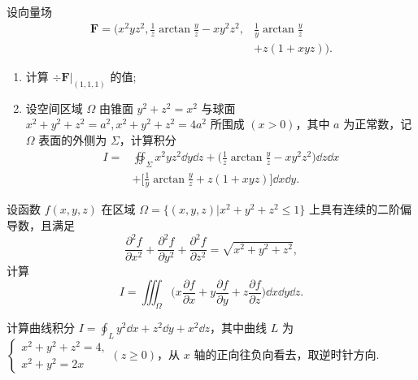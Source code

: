 	\begin{ti}
		设向量场
		\begin{align*}
			\bm F = \Biggl( x^{2} y z^{2}, \frac{1}{z} \arctan \frac{y}{z} - x y^{2} z^{2}, &\frac{1}{y} \arctan \frac{y}{z}\\
			&+ z(1 + xyz) \Biggr).
		\end{align*}
		\begin{enumerate}
			\item 计算 $\div \bm F |_{(1,1,1)}$ 的值;
			\item 设空间区域 $\varOmega$ 由锥面 $y^{2} + z^{2} = x^{2}$ 与球面 $x^{2} + y^{2} + z^{2} = a^{2}, x^{2} + y^{2} + z^{2} = 4 a^{2}$ 所围成 $(x > 0)$，其中 $a$ 为正常数，记 $\varOmega$ 表面的外侧为 $\varSigma$，计算积分
			\begin{align*}
				I =& \oiint_{\varSigma} x^{2} y z^{2} \dd{y} \dd{z} + \Biggl( \frac{1}{z} \arctan \frac{y}{z} - x y^{2} z^{2} \Biggr) \dd{z} \dd{x}\\
				&+ \Biggl[ \frac{1}{y} \arctan \frac{y}{z} + z(1 + xyz) \Biggr] \dd{x} \dd{y}.
			\end{align*}
		\end{enumerate}
	\end{ti}

	\begin{ti}
		设函数 $f(x,y,z)$ 在区域 $\varOmega = \bigl\{ (x,y,z) \bigl| x^{2} + y^{2} + z^{2} \leq 1 \bigr\}$ 上具有连续的二阶偏导数，且满足
		\[
			\frac{\partial^{2}f}{\partial x^{2}} + \frac{\partial^{2}f}{\partial y^{2}} + \frac{\partial^{2}f}{\partial z^{2}} = \sqrt{x^{2} + y^{2} + z^{2}},
		\]
		计算
		\[
			I = \iiint_{\varOmega} \Biggl( x \frac{\partial f}{\partial x} + y \frac{\partial f}{\partial y} + z \frac{\partial f}{\partial z} \Biggr) \dd{x} \dd{y} \dd{z}.
		\]
	\end{ti}

	\begin{ti}
		计算曲线积分 $I = \oint_{L} y^{2} \dd{x} + z^{2} \dd{y} + x^{2} \dd{z}$，其中曲线 $L$ 为 $\begin{cases}
			x^{2} + y^{2} + z^{2} = 4,\\
			x^{2} + y^{2} = 2x
		\end{cases} (z \geq 0)$，从 $x$ 轴的正向往负向看去，取逆时针方向.
	\end{ti}